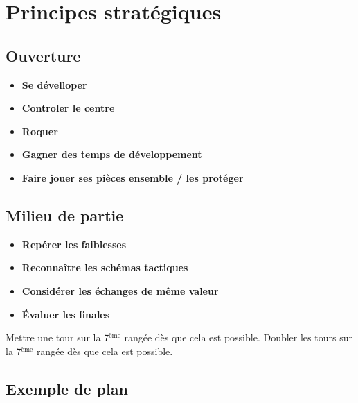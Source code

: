 \chapter{Principes stratégiques}


\section{Ouverture}

\begin{itemize}[leftmargin=2.7cm, label=, itemsep=0pt]%
\item  {\bf Se dévelloper}
\item  {\bf Controler le centre}
\item  {\bf Roquer}
\end{itemize}

\begin{itemize}[leftmargin=2.7cm, label=, itemsep=0pt]%
\item  {\bf Gagner des  temps de développement}
\item  {\bf Faire jouer ses pièces ensemble / les protéger}
\end{itemize}

\section{Milieu de partie}
\begin{itemize}[leftmargin=2.7cm, label=, itemsep=0pt]%
\item  {\bf Repérer les faiblesses}
\item  {\bf Reconnaître les schémas tactiques}
\item  {\bf Considérer les échanges de même valeur}
\item  {\bf Évaluer les finales}
\end{itemize}

Mettre une tour sur la 7$^\text{ème}$ rangée dès que cela est possible.
Doubler les tours sur la 7$^\text{ème}$ rangée dès que cela est possible.

\section{Exemple de plan}

